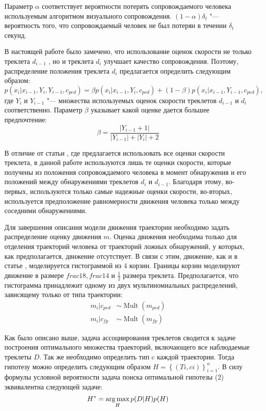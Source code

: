 Параметр $\alpha$ соответствует вероятности потерять сопровождаемого человека используемым алгоритмом визуального сопровождения. $(1-\alpha)\delta_t$ "--- вероятность того, что сопровождаемый человек не был потерян в течении $\delta_t$ секунд.

В настоящей работе было замечено, что использование оценок скорости не только треклета $d_{i-1}$ , но и треклета $d_i$ улучшает качество сопровождения. Поэтому, распределение положения треклета $d_i$ предлагается определить следующим образом:
\begin{equation}
	p(x_i |x_{i-1}, Y_i, Y_{i-1}, c_{ped}) = \beta p(x_i|x_{i-1}, Y_i, c_{ped}) + (1 - \beta) p(x_i|x_{i-1}, Y_{i-1}, c_{ped}),
\end{equation}
где $Y_i$ и $Y_{i-1}$ "--- множества используемых оценок скорости треклетов $d_{i-1}$ и $d_i$ соответственно. Параметр $\beta$ указывает какой оценке дается большее предпочтение:
\begin{equation}
	\beta=\frac{\left|Y_{i-1} + 1\right|}{\left|Y_{i-1}\right| + \left|Y_i\right| + 2}
\end{equation}

В отличие от статьи \cite{benfold2011stable}, где предлагается использовать все оценки скорости треклета, в данной работе используются лишь те оценки скорости, которые получены из положения сопровождаемого человека в момент обнаружения и его положений между обнаружениями треклетов $d_i$ и $d_{i-1}$. Благодаря этому, во-первых, используются только самые надежные оценки скорости, во-вторых, используется предположение равномерности движения человека только между соседними обнаружениями.

Для завершения описания модели движения траектории необходимо задать распределение оценку движения $m$. Оценка движения необходима только для отделения траекторий человека от траекторий ложных обнаружений, у которых, как предполагается, движение отсутствует. В связи с этим, движение, как и в статье \cite{benfold2011stable}, моделируется гистограммой из 4 корзин. Границы корзин моделируют движение в размере $frac{1}{8}, frac{1}{4}$ и $\frac{1}{2}$ размера треклета. Предполагается, что гистограмма принадлежит одному из двух мультиномиальных распределений, зависящему только от типа траектории:
\begin{align}
m_i |c_{ped} &\sim \mathop{Mult}(m_{ped}) \\
m_i |c_{fp} &\sim \mathop{Mult}(m_{fp})
\end{align}

Как было описано выше, задача ассоциирования треклетов сводится к задаче построения оптимального множества траекторий, включающего все наблюдаемые треклеты $D$. Так же необходимо определить тип c каждой траектории. Тогда гипотезу можно определить следующим образом $H = \left\{\left(T i , c i \right)\right\}^n_{i=1}$. В силу формулы условной вероятности задача поиска оптимальной гипотезы (2) эквивалентна следующей задаче:
\begin{equation}
H^* = \operatorname*{arg\,max}_H p(D|H)p(H)
\end{equation}

